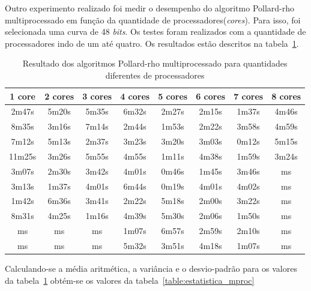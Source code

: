 Outro experimento realizado foi medir o desempenho do algoritmo Pollard-rho multiprocessado em função da quantidade de processadores(\textit{cores}). Para isso, foi selecionada uma curva de 48 \textit{bits}. Os testes foram realizados com a quantidade de processadores indo de um até quatro. Os resultados estão descritos na tabela~\ref{table:results_mproc}.

\begin{table}[h]
\centering
\begin{tabular}{|c|c|c|c|c|c|c|c|}
\hline
\rowcolor[gray]{0.9}
\textbf{1 core}  & \textbf{2 cores} & \textbf{3 cores} & \textbf{4 cores} & \textbf{5 cores} & \textbf{6 cores} & \textbf{7 cores} & \textbf{8 cores}\\ \hline
2m47s    & 5m20s   & 5m35s   & 6m32s   & 2m27s   & 2m15s   & 1m37s   & 4m46s \\ \hline
8m35s    & 3m16s   & 7m14s   & 2m44s   & 1m53s   & 2m22s   & 3m58s   & 4m59s \\ \hline
7m12s    & 5m13s   & 2m37s   & 3m23s   & 3m20s   & 3m03s   & 0m12s   & 5m15s \\ \hline
11m25s   & 3m26s   & 5m55s   & 4m55s   & 1m11s   & 4m38s   & 1m59s   & 3m24s \\ \hline
3m07s    & 2m30s   & 3m42s   & 4m01s   & 0m46s   & 1m45s   & 3m46s   & ms \\ \hline
3m13s    & 1m37s   & 4m01s   & 6m44s   & 0m19s   & 4m01s   & 4m02s   & ms \\ \hline
1m42s    & 6m36s   & 3m41s   & 2m22s   & 5m18s   & 2m00s   & 3m22s   & ms \\ \hline
8m31s    & 4m25s   & 1m16s   & 4m39s   & 5m30s   & 2m06s   & 1m50s   & ms \\ \hline
ms    & ms   & ms   & 1m07s   & 6m57s   & 2m59s   & 2m10s   & ms \\ \hline
ms    & ms   & ms   & 5m32s   & 3m51s   & 4m18s   & 1m07s   & ms \\ \hline
\end{tabular}
\caption{Resultado dos algoritmos Pollard-rho multiprocessado para quantidades diferentes de processadores}
\label{table:results_mproc}
\end{table}

Calculando-se a média aritmética, a variância e o desvio-padrão para os valores da tabela~\ref{table:results_mproc} obtém-se os valores da tabela~\ref{table:estatistica_mproc}

